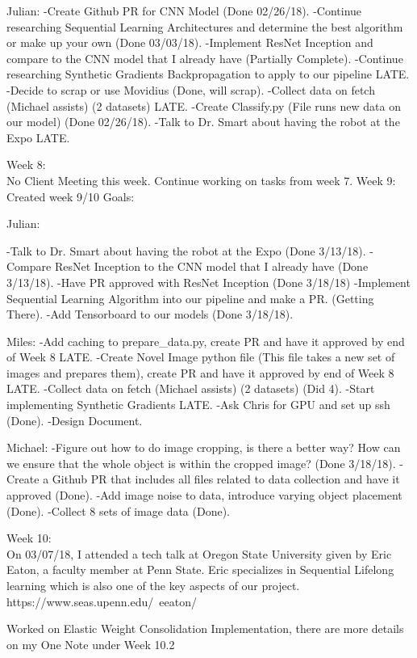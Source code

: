 \documentclass[draftclsnofoot, onecolumn, 10pt, compsoc]{IEEEtran}
\begin{document}
	Julian:
		-Create Github PR for CNN Model (Done 02/26/18).
		-Continue researching Sequential Learning Architectures and determine the best algorithm or make up your own (Done 03/03/18).
		-Implement ResNet Inception and compare to the CNN model that I already have (Partially Complete).
		-Continue researching Synthetic Gradients Backpropagation to apply to our pipeline LATE.
		-Decide to scrap or use Movidius (Done, will scrap).
		-Collect data on fetch (Michael assists) (2 datasets) LATE.
		-Create Classify.py (File runs new data on our model) (Done 02/26/18).
		-Talk to Dr. Smart about having the robot at the Expo LATE.

Week 8:
\\ \indent No Client Meeting this week. Continue working on tasks from week 7.
Week 9:
\\ \indent Created week 9/10 Goals:

Julian:
	
	-Talk to Dr. Smart about having the robot at the Expo (Done 3/13/18).
	-Compare ResNet Inception to the CNN model that I already have (Done 3/13/18).
	-Have PR approved with ResNet Inception (Done 3/18/18)
	-Implement Sequential Learning Algorithm into our pipeline and make a PR. (Getting There).
	-Add Tensorboard to our models (Done 3/18/18).
	
Miles:
	-Add caching to prepare\_data.py, create PR and have it approved by end of Week 8 LATE.
	-Create Novel Image python file (This file takes a new set of images and prepares them), create PR and have it approved by end of Week 8 LATE.
	-Collect data on fetch (Michael assists) (2 datasets) (Did 4).
	-Start implementing Synthetic Gradients LATE.
	-Ask Chris for GPU and set up ssh (Done).
	-Design Document. 

Michael:
	-Figure out how to do image cropping, is there a better way? How can we ensure that the whole object is within the cropped image? (Done 3/18/18).
	-Create a Github PR that includes all files related to data collection and have it approved  (Done).
	-Add image noise to data, introduce varying object placement (Done).
	-Collect 8 sets of image data (Done).

Week 10:
\\ \indent On 03/07/18, I attended a tech talk at Oregon State University given by Eric Eaton, a faculty member at Penn State. Eric specializes in Sequential Lifelong learning which is also one of the key aspects of our project. https://www.seas.upenn.edu/~eeaton/

Worked on Elastic Weight Consolidation Implementation, there are more details on my One Note under Week 10.2
  
\end{document}
